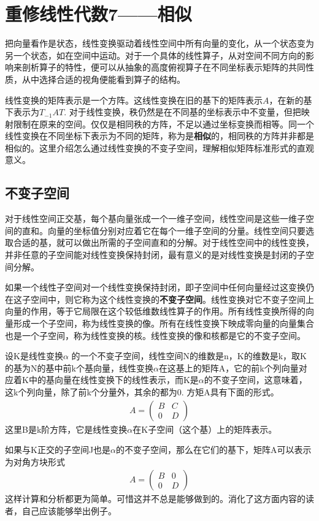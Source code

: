 \section{重修线性代数7——相似}
	把向量看作是状态，线性变换驱动着线性空间中所有向量的变化，从一个状态变为另一个状态，如在空间中运动。对于一个具体的线性算子，从对空间不同方向的影响来剖析算子的特性，便可以从抽象的高度俯视算子在不同坐标表示矩阵的共同性质，从中选择合适的视角便能看到算子的结构。
	
	线性变换的矩阵表示是一个方阵。这线性变换在旧的基下的矩阵表示$ A $，在新的基下表示为$ T_{-1}AT $. 对于线性变换，秩仍然是在不同基的坐标表示中不变量，但把映射限制在原来的空间。仅仅是相同秩的方阵，不足以通过坐标变换而相等。同一个线性变换在不同坐标下表示为不同的矩阵，称为是\textbf{相似}的，相同秩的方阵并非都是相似的。这里介绍怎么通过线性变换的不变子空间，理解相似矩阵标准形式的直观意义。
	
	\subsection{不变子空间}
	
	对于线性空间正交基，每个基向量张成一个一维子空间，线性空间是这些一维子空间的直和。向量的坐标值分别对应着它在每个一维子空间的分量。线性空间只要选取合适的基，就可以做出所需的子空间直和的分解。对于线性空间中的线性变换，并非任意的子空间能对线性变换保持封闭，最有意义的是对线性变换是封闭的子空间分解。
	
	如果一个线性子空间对一个线性变换保持封闭，即子空间中任何向量经过这变换仍在这子空间中，则它称为这个线性变换的\textbf{不变子空间}。线性变换对它不变子空间上向量的作用，等于它局限在这个较低维数线性算子的作用。所有线性变换所得的向量形成一个子空间，称为线性变换的像。所有在线性变换下映成零向量的向量集合也是一个子空间，称为线性变换的核。线性变换的像和核都是它的不变子空间。
	
	设K是线性变换$ \alpha $ 的一个不变子空间，线性空间N的维数是n，K的维数是k，取K的基为N的基中前k个基向量，线性变换$ \alpha $在这基上的矩阵A，它的前k个列向量对应着K中的基向量在线性变换下的线性表示，而K是$ \alpha $的不变子空间，这意味着，这k个列向量，除了前k个分量外，其余的都为0. 方矩A具有下面的形式。
	\begin{gather*}
		A = \begin{pmatrix} B & C\\0 & D\end{pmatrix}
	\end{gather*}
	这里B是k阶方阵，它是线性变换$ \alpha $在K子空间（这个基）上的矩阵表示。
	
	如果与K正交的子空间J也是$ \alpha $的不变子空间，那么在它们的基下，矩阵A可以表示为对角方块形式
	\begin{gather*}
	A = \begin{pmatrix} B & 0\\0 & D\end{pmatrix}
	\end{gather*}
	这样计算和分析都更为简单。可惜这并不总是能够做到的。消化了这方面内容的读者，自己应该能够举出例子。
	
